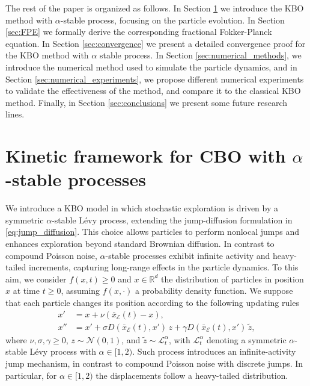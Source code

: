 \documentclass[11pt,handout]{article}%
\numberwithin{equation}{section}
\theoremstyle{definition}
\begin{document}
The rest of the paper is organized as follows. In Section \ref{sec:particles_representation} we introduce the KBO method with $\alpha$-stable process, focusing on the particle evolution. In Section \ref{sec:FPE} we formally derive the corresponding fractional Fokker-Planck equation. In Section \ref{sec:convergence} we present a detailed convergence proof for the KBO method with $\alpha$ stable process. In Section \ref{sec:numerical_methods}, we introduce the numerical method used to simulate the particle dynamics, and in Section \ref{sec:numerical_experiments}, we propose different numerical experiments to validate the effectiveness of the method, and compare it to the classical KBO method. Finally, in Section \ref{sec:conclusions} we present some future research lines. 
\section{Kinetic framework for CBO with \texorpdfstring{$\alpha$}{alpha}-stable processes}\label{sec:particles_representation}
We introduce a KBO model in which stochastic exploration is driven by a symmetric $\alpha$-stable L\'evy process, extending the jump-diffusion formulation in \eqref{eq:jump_diffusion}. This choice allows particles to perform nonlocal jumps and enhances exploration beyond standard Brownian diffusion. In contrast to compound Poisson noise, $\alpha$-stable processes exhibit infinite activity and heavy-tailed increments, capturing long-range effects in the particle dynamics.
To this aim, we consider $f(x,t)
\geq 0$ and $x\in \mathbb{R}^d$ the distribution of particles in position $x$ at time $t
\geq 0$, assuming $f(x,
\cdot)$ a probability density function.
We suppose that each particle changes its position according to the following updating rules 
\begin{subequations}\label{eq:KBO_alfa_stable}
	\begin{align}
		x'   &= x + \nu (\bar{x}_\mathcal{E}(t) - x), \\
		x''  &= x' + \sigma D(\bar{x}_\mathcal{E}(t),x')\, z  + \gamma D(\bar{x}_\mathcal{E}(t),x')\, \tilde{z},
	\end{align}
\end{subequations}
where $\nu,\sigma,\gamma \geq 0$, $z \sim \mathcal{N}(0,1)$, and $\tilde{z} \sim \mathcal{L}_t^\alpha$, with $\mathcal{L}_t^\alpha$ denoting a symmetric $\alpha$-stable L\'evy process with $\alpha \in [1,2)$. Such process introduces an infinite-activity jump mechanism, in contrast to compound Poisson noise with discrete jumps. In particular, for $\alpha \in [1,2)$ the displacements follow a heavy-tailed distribution.
\end{document}
